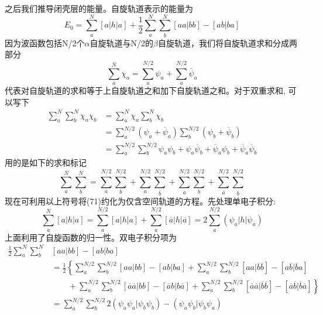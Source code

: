 \documentclass[]{article}
\begin{document}
之后我们推导闭壳层的能量。自旋轨道表示的能量为
\begin{equation}
	E_0=\sum\limits_a^N [a|h|a]+\frac{1}{2}\sum\limits_a^N \sum\limits_b^N [aa|bb]-[ab|ba]
\end{equation}
因为波函数包括N/2个$\alpha$自旋轨道与N/2的$\beta$自旋轨道，我们将自旋轨道求和分成两部分
\begin{equation}
	\sum\limits_a^N\chi_a=\sum\limits_a^{N/2}\psi_a+\sum\limits_a^{N/2}\overline{\psi}_a
\end{equation}
代表对自旋轨道的求和等于上自旋轨道之和加下自旋轨道之和。对于双重求和, 可以写下
\begin{align}
	\sum\limits_a^N\sum\limits_b^N\chi_a\chi_b
	&=\sum\limits_a^N\chi_a\sum\limits_b^N\chi_b\nonumber\\
	&=\sum\limits_a^{N/2}\left( \psi_a+\overline{\psi}_a\right)\sum\limits_b^{N/2}\left( \psi_b+\overline{\psi}_b\right) \nonumber\\
	&=\sum\limits_a^{N/2}\sum\limits_b^{N/2}\psi_a\psi_b+\psi_a\overline{\psi}_b+\overline{\psi}_a\psi_b+\overline{\psi}_a\overline{\psi}_b
\end{align}
用的是如下的求和标记
\begin{equation}
	\sum\limits_a^N\sum\limits_b^N=\sum\limits_a^{N/2}\sum\limits_b^{N/2}+\sum\limits_a^{N/2}\sum\limits_{\overline{b}}^{N/2}+\sum\limits_{\overline{a}}^{N/2}\sum\limits_b^{N/2}+\sum\limits_{\overline{a}}^{N/2}\sum\limits_{\overline{b}}^{N/2}
\end{equation}
现在可利用以上符号将(71)约化为仅含空间轨道的方程。先处理单电子积分:
\begin{equation}
	\sum\limits_a^N[a|h|a]=\sum\limits_a^{N/2}[a|h|a]+\sum\limits_a^{N/2}[\overline{a}|h|\overline{a}]=2\sum\limits_a^{N/2}(\psi_a|h|\psi_a)
\end{equation}
上面利用了自旋函数的归一性。双电子积分项为
\begin{align}
	\frac{1}{2}\sum\limits_a^N\sum\limits_b^N
	&[aa|bb]-[ab|ba]\nonumber\\
	&=\frac{1}{2}\left\{ \sum\limits_a^{N/2}\sum\limits_b^{N/2}[aa|bb]-[ab|ba]+\sum\limits_a^{N/2}\sum\limits_b^{N/2}[aa|\overline{b}\overline{b}]-[a\overline{b}|\overline{b}a]\nonumber\right.\\
	&\left.\quad\quad+\sum\limits_a^{N/2}\sum\limits_b^{N/2}[\overline{a}\overline{a}|bb]-[\overline{a}b|b\overline{a}]+\sum\limits_a^{N/2}\sum\limits_b^{N/2}[\overline{a}\overline{a}|\overline{b}\overline{b}]-[\overline{a}\overline{b}|\overline{b}\overline{a}]\right\} \nonumber\\
	&=\sum\limits_a^{N/2}\sum\limits_b^{N/2}2(\psi_a\psi_a|\psi_b\psi_b)-(\psi_a\psi_b|\psi_b\psi_a)
\end{align}
\end{document}
